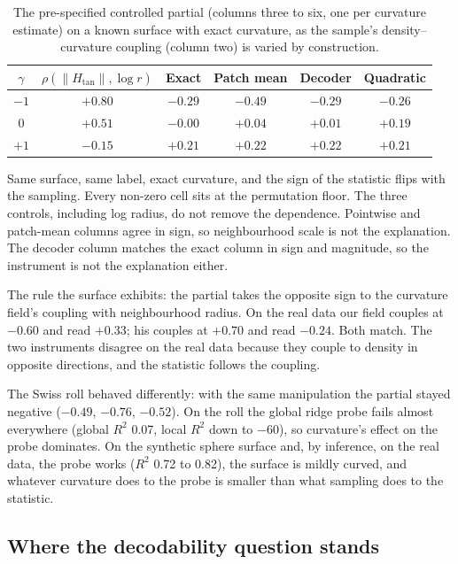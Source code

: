 \documentclass[11pt,a4paper]{article}
\newcommand{\Htan}{H_{\mathrm{tan}}}
\newcommand{\norm}[1]{\left\lVert #1 \right\rVert}
\begin{document}
\begin{table}[h]
\centering
\small
\begin{tabular}{cccccc}
\toprule
$\gamma$ & $\rho(\norm{\Htan}, \log r)$ & Exact & Patch mean & Decoder & Quadratic \\
\midrule
$-1$ & $+0.80$ & $-0.29$ & $-0.49$ & $-0.29$ & $-0.26$ \\
$0$  & $+0.51$ & $-0.00$ & $+0.04$ & $+0.01$ & $+0.19$ \\
$+1$ & $-0.15$ & $+0.21$ & $+0.22$ & $+0.22$ & $+0.21$ \\
\bottomrule
\end{tabular}
\caption{The pre-specified controlled partial (columns three to six, one per curvature estimate) on a known surface with exact curvature, as the sample's density--curvature coupling (column two) is varied by construction.}
\label{tab:coupling}
\end{table}

Same surface, same label, exact curvature, and the sign of the statistic flips with the sampling. Every non-zero cell sits at the permutation floor. The three controls, including log radius, do not remove the dependence. Pointwise and patch-mean columns agree in sign, so neighbourhood scale is not the explanation. The decoder column matches the exact column in sign and magnitude, so the instrument is not the explanation either.

The rule the surface exhibits: the partial takes the opposite sign to the curvature field's coupling with neighbourhood radius. On the real data our field couples at $-0.60$ and read $+0.33$; his couples at $+0.70$ and read $-0.24$. Both match. The two instruments disagree on the real data because they couple to density in opposite directions, and the statistic follows the coupling.

The Swiss roll behaved differently: with the same manipulation the partial stayed negative ($-0.49$, $-0.76$, $-0.52$). On the roll the global ridge probe fails almost everywhere (global $R^2$ 0.07, local $R^2$ down to $-60$), so curvature's effect on the probe dominates. On the synthetic sphere surface and, by inference, on the real data, the probe works ($R^2$ 0.72 to 0.82), the surface is mildly curved, and whatever curvature does to the probe is smaller than what sampling does to the statistic.

\subsection{Where the decodability question stands}
\end{document}
